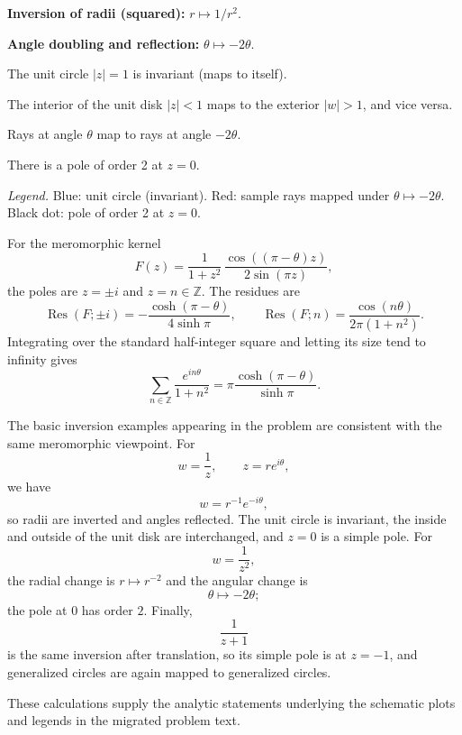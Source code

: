 \begin{problem}[CP-IV-0110]
	\par\noindent\textbullet\quad \textbf{Inversion of radii (squared):} $r \mapsto 1/r^2$.
	\par\noindent\textbullet\quad \textbf{Angle doubling and reflection:} $\theta \mapsto -2\theta$.
	\par\noindent\textbullet\quad The unit circle $|z|=1$ is invariant (maps to itself).
	\par\noindent\textbullet\quad The interior of the unit disk $|z|<1$ maps to the exterior $|w|>1$, and vice versa.
	\par\noindent\textbullet\quad Rays at angle $\theta$ map to rays at angle $-2\theta$.
	\par\noindent\textbullet\quad There is a pole of order 2 at $z=0$.

\begin{center}

	\hspace{1.5cm}

\end{center}

\textit{Legend.}
Blue: unit circle (invariant).
Red: sample rays mapped under $\theta \mapsto -2\theta$.
Black dot: pole of order 2 at $z=0$.
\end{problem}

\begin{solution}
For the meromorphic kernel
\[
F(z)=\frac{1}{1+z^2}\,
\frac{\cos((\pi-\theta)z)}{2\sin(\pi z)},
\]
the poles are \(z=\pm i\) and \(z=n\in\mathbb Z\). The residues are
\[
\operatorname{Res}(F;\pm i)
=
-\frac{\cosh(\pi-\theta)}{4\sinh\pi},
\qquad
\operatorname{Res}(F;n)
=
\frac{\cos(n\theta)}{2\pi(1+n^2)}.
\]
Integrating over the standard half-integer square and letting its size tend to infinity gives
\[
\sum_{n\in\mathbb Z}\frac{e^{in\theta}}{1+n^2}
=
\pi\frac{\cosh(\pi-\theta)}{\sinh\pi}.
\]

The basic inversion examples appearing in the problem are consistent with the same meromorphic viewpoint. For
\[
w=\frac1z,
\qquad z=re^{i\theta},
\]
we have
\[
w=r^{-1}e^{-i\theta},
\]
so radii are inverted and angles reflected. The unit circle is invariant, the inside and outside of the unit disk are interchanged, and \(z=0\) is a simple pole. For
\[
w=\frac1{z^2},
\]
the radial change is \(r\mapsto r^{-2}\) and the angular change is
\[
\theta\mapsto-2\theta;
\]
the pole at \(0\) has order \(2\). Finally,
\[
\frac1{z+1}
\]
is the same inversion after translation, so its simple pole is at \(z=-1\), and generalized circles are again mapped to generalized circles.

These calculations supply the analytic statements underlying the schematic plots and legends in the migrated problem text.
\end{solution}


